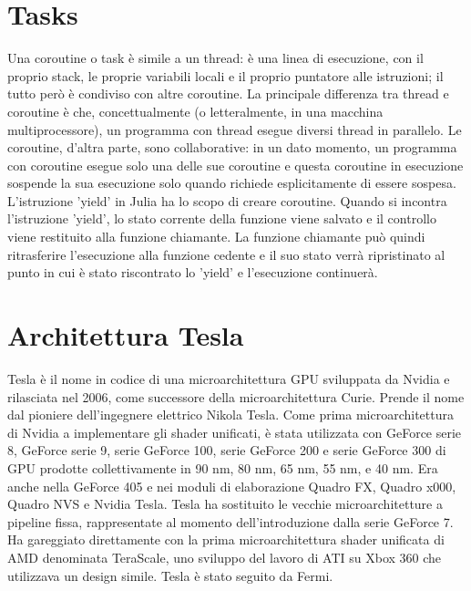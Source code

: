 \documentclass[a4paper]{extreport}
\begin{document}
\begin{multicols*}{2}
\section{Tasks}
Una coroutine o task è simile a un thread: è una linea di esecuzione, con il proprio stack, le proprie variabili locali e il proprio
puntatore alle istruzioni; il tutto però è condiviso con altre coroutine. La principale differenza tra thread e coroutine è che,
concettualmente (o letteralmente, in una macchina multiprocessore), un programma con thread esegue diversi thread in parallelo. 
Le coroutine, d'altra parte, sono collaborative: in un dato momento, un programma con coroutine esegue solo una delle sue coroutine
e questa coroutine in esecuzione sospende la sua esecuzione solo quando richiede esplicitamente di essere sospesa.~\cite{tasks}\\
L'istruzione 'yield' in Julia ha lo scopo di creare coroutine. Quando si incontra l'istruzione 'yield', lo stato corrente della
funzione viene salvato e il controllo viene restituito alla funzione chiamante.
La funzione chiamante può quindi ritrasferire l'esecuzione alla funzione cedente e il suo stato verrà ripristinato al punto in cui
è stato riscontrato lo 'yield' e l'esecuzione continuerà.
\section{Architettura Tesla}
Tesla è il nome in codice di una microarchitettura GPU sviluppata da Nvidia e rilasciata nel 2006, come successore della microarchitettura Curie. Prende il nome dal pioniere dell'ingegnere elettrico Nikola Tesla. Come prima microarchitettura di Nvidia a implementare gli shader unificati, è stata utilizzata con GeForce serie 8, GeForce serie 9, serie GeForce 100, serie GeForce 200 e serie GeForce 300 di GPU prodotte collettivamente in 90 nm, 80 nm, 65 nm, 55 nm, e 40 nm. Era anche nella GeForce 405 e nei moduli di elaborazione Quadro FX, Quadro x000, Quadro NVS e Nvidia Tesla.
Tesla ha sostituito le vecchie microarchitetture a pipeline fissa, rappresentate al momento dell'introduzione dalla serie GeForce 7. Ha gareggiato direttamente con la prima microarchitettura shader unificata di AMD denominata TeraScale, uno sviluppo del lavoro di ATI su Xbox 360 che utilizzava un design simile. Tesla è stato seguito da Fermi.
\end{multicols*}
\end{document}
